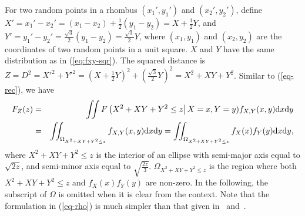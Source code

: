 \documentclass[12pt,draftclsnofoot,onecolumn]{IEEEtran}
\begin{document}
For two random points in a rhombus $(x_1',y_1')$ and $(x_2',y_2')$, define
$X'=x_1'-x_2'=\left(x_1-x_2\right)+\frac{1}{2}\left(y_1-y_2\right)=X+\frac{1}{2}
Y$, and
$Y'=y_1'-y_2'=\frac{\sqrt{3}}{2}\left(y_1-y_2\right)=\frac{\sqrt{3}}{2}Y$, where
$(x_1, y_1)$ and $(x_2, y_2)$ are the coordinates of two random points in a
unit square. $X$ and $Y$ have the same distribution as in
(\ref{eq:fxy-sqr}). The squared distance is $Z=D^2=X'^2+Y'^2=\left(X+\frac{1}{2}
Y\right)^2+\left(\frac{\sqrt{3}}{2}Y\right)^2=X^2+XY+Y^2$. Similar to
(\ref{eq-rec}), we have
\begin{eqnarray}\label{eq-rho}
F_Z(z)&=&\iint F\left(X^2+XY+Y^2 \leq z\right|X=x, Y=y)f_{X,Y}(x,y){\rm d}x{\rm
d}y\nonumber\\
&=&\iint_{\Omega_{X^2+XY+Y^2 \leq z}}f_{X,Y}(x,y){\rm d}x{\rm d}y=
\iint_{\Omega_{X^2+XY+Y^2 \leq z}}f_X(x)f_Y(y){\rm d}x{\rm d}y,
\end{eqnarray}
where $X^2+XY+Y^2 \leq z$ is the interior of an ellipse with semi-major axis
equal to $\sqrt{2z}$, and semi-minor axis equal to $\sqrt{\frac{2z}{3}}$.
$\Omega_{X^2+XY+Y^2 \leq z}$ is the region where both $X^2+XY+Y^2 \leq z$ and
$f_X(x)f_Y(y)$ are non-zero. In the following, the subscript of $\Omega$ is
omitted when it is clear from the context.
Note that the formulation in (\ref{eq-rho}) is much simpler than that given in~\cite{zhuang2011random}
and~\cite{zhuang2012geometrical}.
\end{document}
